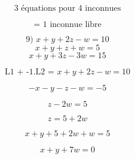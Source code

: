 \documentclass{article}
\begin{document}
\[
\text{3 équations pour 4 inconnues}
\]

\[
\text{= 1 inconnue libre}
\]

\[
\text{9) } x+y+2z-w=10
\]
\[
x+y+z+w=5
\]
\[
x+y+3z-3w=15
\]

\[
\text{L1 + -1.L2 = } x+y+2z-w=10
\]

\[
-x-y-z-w=-5
\]

\[
z-2w=5
\]

\[
z = 5+2w
\]

\[
x+y+5+2w+w=5
\]

\[
x+y+7w=0 
\]
\end{document}
